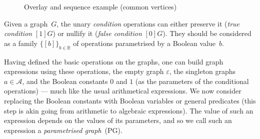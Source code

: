 \begin{figure}[t]
\begin{centering}
{}\hfill{}\hfill{}\hfill{}
\par\end{centering}

\caption{Overlay and sequence example (common vertices)\label{fig:Overlay-and-sequence}}
\end{figure}

Given a graph~$G$, the unary \emph{condition} operations can either
preserve it (\emph{true condition} $[1]G$) or nullify it (\emph{false
condition} $[0]G$). They should be considered as a family $\{[b]\}_{b\in\mathbb{B}}$
of operations parametrised by a Boolean value~$b$.

Having defined the basic operations on the graphs, one can build graph
expressions using these operations, the empty graph $\varepsilon$,
the singleton graphs $a\in\mathcal{A}$, and the Boolean constants
$0$ and $1$ (as the parameters of the conditional operations) ---
much like the usual arithmetical expressions. We now consider replacing
the Boolean constants with Boolean variables or general predicates
(this step is akin going from arithmetic to algebraic expressions).
The value of such an expression depends on the values of its parameters,
and so we call such an expression a \emph{parametrised graph}~(PG).

